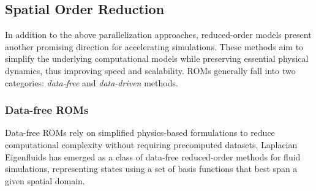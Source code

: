 
\subsection{Spatial Order Reduction} \label{sec:related_roms}
In addition to the above parallelization approaches, reduced-order models present another promising direction for accelerating simulations. These methods aim to simplify the underlying computational models while preserving essential physical dynamics, thus improving speed and scalability. ROMs generally fall into two categories: \emph{data-free} and \emph{data-driven} methods.

\subsubsection{Data-free ROMs}
Data-free ROMs rely on simplified physics-based formulations to reduce computational complexity without requiring precomputed datasets. Laplacian Eigenfluids \cite{de2012fluid, liu2015model, cui2018scalable} has emerged as a class of data-free reduced-order methods for fluid simulations, representing states using a set of basis functions that best span a given spatial domain.


